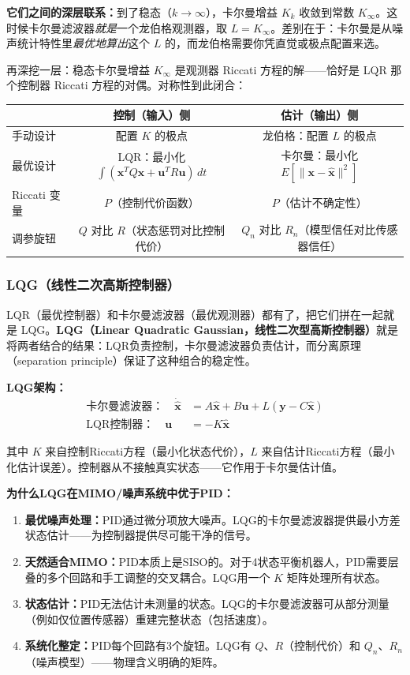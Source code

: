 \textbf{它们之间的深层联系：}到了稳态（$k \to \infty$），卡尔曼增益 $K_k$ 收敛到常数 $K_\infty$。这时候卡尔曼滤波器\textit{就是}一个龙伯格观测器，取 $L = K_\infty$。差别在于：卡尔曼是从噪声统计特性里\textit{最优地算出}这个 $L$ 的，而龙伯格需要你凭直觉或极点配置来选。

再深挖一层：稳态卡尔曼增益 $K_\infty$ 是观测器 Riccati 方程的解——恰好是 LQR 那个控制器 Riccati 方程的对偶。对称性到此闭合：

\begin{center}
\begin{tabular}{lcc}
\toprule
 & \textbf{控制（输入）侧} & \textbf{估计（输出）侧} \\
\midrule
手动设计 & 配置 $K$ 的极点 & 龙伯格：配置 $L$ 的极点 \\
最优设计 & LQR：最小化 $\int (\mathbf{x}^TQ\mathbf{x} + \mathbf{u}^TR\mathbf{u})\,dt$ & 卡尔曼：最小化 $E[\|\mathbf{x} - \hat{\mathbf{x}}\|^2]$ \\
Riccati 变量 & $P$（控制代价函数） & $P$（估计不确定性） \\
调参旋钮 & $Q$ 对比 $R$（状态惩罚对比控制代价） & $Q_n$ 对比 $R_n$（模型信任对比传感器信任） \\
\bottomrule
\end{tabular}
\end{center}

\subsubsection{LQG（线性二次高斯控制器）}

LQR（最优控制器）和卡尔曼滤波器（最优观测器）都有了，把它们拼在一起就是 LQG。\textbf{LQG（Linear Quadratic Gaussian，线性二次型高斯控制器）}就是将两者结合的结果：LQR负责控制，卡尔曼滤波器负责估计，而分离原理（separation principle）保证了这种组合的稳定性。

\textbf{LQG架构：}
\begin{align}
\text{卡尔曼滤波器：} \quad \dot{\hat{\mathbf{x}}} &= A\hat{\mathbf{x}} + B\mathbf{u} + L(\mathbf{y} - C\hat{\mathbf{x}}) \\
\text{LQR控制器：} \quad \mathbf{u} &= -K\hat{\mathbf{x}}
\end{align}

其中 $K$ 来自控制Riccati方程（最小化状态代价），$L$ 来自估计Riccati方程（最小化估计误差）。控制器从不接触真实状态——它作用于卡尔曼估计值。

\textbf{为什么LQG在MIMO/噪声系统中优于PID：}
\begin{enumerate}
    \item \textbf{最优噪声处理：}PID通过微分项放大噪声。LQG的卡尔曼滤波器提供最小方差状态估计——为控制器提供尽可能干净的信号。
    \item \textbf{天然适合MIMO：}PID本质上是SISO的。对于4状态平衡机器人，PID需要层叠的多个回路和手工调整的交叉耦合。LQG用一个 $K$ 矩阵处理所有状态。
    \item \textbf{状态估计：}PID无法估计未测量的状态。LQG的卡尔曼滤波器可从部分测量（例如仅位置传感器）重建完整状态（包括速度）。
    \item \textbf{系统化整定：}PID每个回路有3个旋钮。LQG有 $Q$、$R$（控制代价）和 $Q_n$、$R_n$（噪声模型）——物理含义明确的矩阵。
\end{enumerate}

